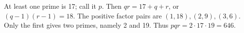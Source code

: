 At least one prime is 17; call it $p$. Then $qr=17+q+r$, or $(q-1)(r-1)=18$. The positive factor pairs are $(1,18),(2,9),(3,6)$. Only the first gives two primes, namely 2 and 19. Thus $\boxed{pqr=2\cdot17\cdot19=646}$.

